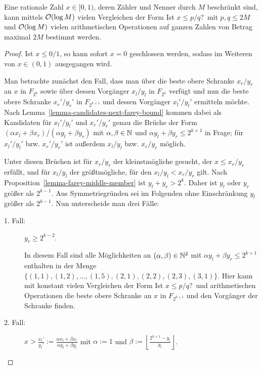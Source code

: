 \begin{theorem}\label{theorem-find-fraction}
	Eine rationale Zahl $x\in[0,1)$, deren Zähler und Nenner durch $M$ beschränkt sind, kann mittels $\mathcal{O}(\log M)$ vielen Vergleichen der Form \glqq Ist $x\leq p/q$?\grqq\ mit $p,q\leq 2M$ und $\mathcal{O}(\log M)$ vielen arithmetischen Operationen auf ganzen Zahlen von Betrag maximal $2M$ bestimmt werden.
\end{theorem}
\begin{proof}
	Ist $x\leq 0/1$, so kann sofort $x=0$ geschlossen werden, sodass im Weiteren von $x\in(0,1)$ ausgegangen wird.
	
	Man betrachte zunächst den Fall, dass man über die beste obere Schranke $x_r/y_r$ an $x$ in $F_{2^k}$ sowie über dessen Vorgänger $x_l/y_l$ in $F_{2^k}$ verfügt und nun die beste obere Schranke $x_r'/y_r'$ in $F_{2^{k+1}}$ und dessen Vorgänger $x_l'/y_l'$ ermitteln möchte.
	Nach Lemma~\ref{lemma-candidates-next-farey-bound} kommen dabei als Kandidaten für $x_l'/y_l'$ und $x_r'/y_r'$ genau die Brüche der Form $(\alpha x_l + \beta x_r)/(\alpha y_l + \beta y_r)$ mit $\alpha,\beta\in\mathbb{N}$ und $\alpha y_l + \beta y_r \leq 2^{k+1}$ in Frage; für $x_l'/y_l'$ bzw. $x_r'/y_r'$ ist außerdem $x_l/y_l$ bzw. $x_r/y_r$ möglich.
	
	Unter diesen Brüchen ist für $x_r/y_r$ der kleinstmögliche gesucht, der $x\leq x_r/y_r$ erfüllt, und für $x_l/y_l$ der größtmögliche, für den $x_l/y_l < x_r/y_r$ gilt.
	Nach Proposition~\ref{lemma-farey-middle-member} ist $y_l + y_r > 2^k$.
	Daher ist $y_l$ oder $y_r$ größer als $2^{k-1}$.
	Aus Symmetriegründen sei im Folgenden ohne Einschränkung $y_l$ größer als $2^{k-1}$.
	Nun unterscheide man drei Fälle:
	
	\begin{description}
		\item[1. Fall:] $y_r \geq 2^{k-2}$.
		
		In diesem Fall sind alle Möglichkeiten an $(\alpha,\beta)\in\mathbb{N}^2$ mit $\alpha y_l + \beta y_r \leq 2^{k+1}$ enthalten in der Menge $\{ (1,1), (1,2),\dots,(1,5), (2,1), (2,2),(2,3),(3,1) \}$.
		Hier kann mit konstant vielen Vergleichen der Form \glqq Ist $x\leq p/q$?\grqq\ und arithmetischen Operationen die beste obere Schranke an $x$ in $F_{2^{k+1}}$ und den Vorgänger der Schranke finden.
		
		\item[2. Fall:] $x > \frac{x_l'}{y_l'} := \frac{\alpha x_l + \beta x_r}{\alpha y_l + \beta y_l}$ mit $\alpha := 1$ und $\beta := \left\lfloor \frac{2^{k+1} - y_l}{y_r}\right\rfloor$.
		

\end{description}
\end{proof}
